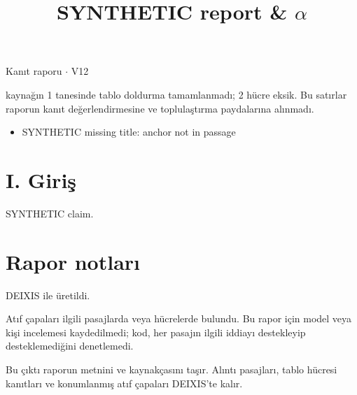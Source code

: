 \documentclass[journal]{IEEEtran}
\begin{document}
\renewcommand{\abstractname}{Özet}
\renewcommand{\IEEEkeywordsname}{Dizin Terimleri}
\renewcommand{\refname}{Kaynaklar}

\title{SYNTHETIC report \& \ensuremath{\alpha}}

\maketitle

\noindent Kanıt raporu \ensuremath{\cdot} V12

 kaynağın 1 tanesinde tablo doldurma tamamlanmadı; 2 hücre eksik. Bu satırlar raporun kanıt değerlendirmesine ve toplulaştırma paydalarına alınmadı.

\begin{itemize}
\item SYNTHETIC missing title: anchor not in passage
\end{itemize}

\section*{I. Giriş}

SYNTHETIC claim. \cite{Synth26}

\section*{Rapor notları}

DEIXIS ile üretildi.

Atıf çapaları ilgili pasajlarda veya hücrelerde bulundu. Bu rapor için model veya kişi incelemesi kaydedilmedi; kod, her pasajın ilgili iddiayı destekleyip desteklemediğini denetlemedi.

Bu çıktı raporun metnini ve kaynakçasını taşır. Alıntı pasajları, tablo hücresi kanıtları ve konumlanmış atıf çapaları DEIXIS'te kalır.




\end{document}
